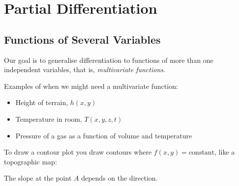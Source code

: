 \documentclass[../main.tex]{subfiles}
\begin{document}
\chapter{Partial Differentiation}
\section{Functions of Several Variables}
Our goal is to generalise differentiation to functions of more than one independent variables, that is, \textit{multivariate functions}.
\begin{example}
  Examples of when we might need a multivariate function:
  \begin{itemize}
    \item Height of terrain, $h(x, y)$
    \item Temperature in room, $T(x, y, z, t)$
    \item Pressure of a gas as a function of volume and temperature
  \end{itemize}
\end{example}
To draw a contour plot you draw contours where $f(x, y) = \text{constant}$, like a topographic map:

\begin{center}
\end{center}

The slope at the point $A$ depends on the direction.
\end{document}
